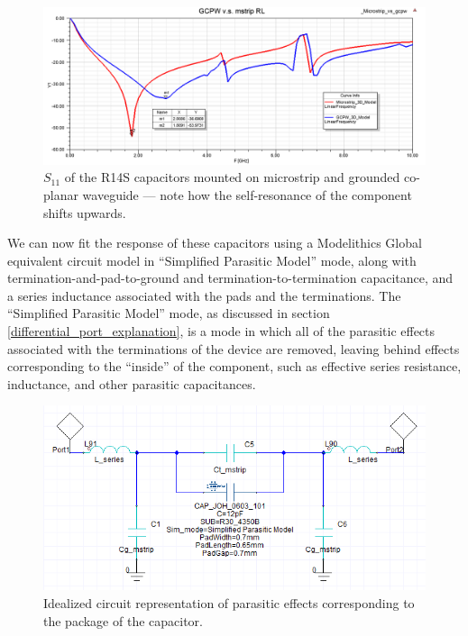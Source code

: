 \documentclass[12pt]{usfcoe}
\begin{document}
        \begin{figure}[H]
			\begin{center}
			\includegraphics[width=6in]{images/mstrip_v_gcpw/S11.png}
			\caption{$S_{11}$ of the R14S capacitors mounted on microstrip and grounded co-planar waveguide --- note how the self-resonance of the component shifts upwards.} 
			\label{fig:mstrip_gcpw_s11}
			\end{center}
        \end{figure}

    We can now fit the response of these capacitors using a Modelithics Global equivalent circuit model in ``Simplified Parasitic Model'' mode, along with termination-and-pad-to-ground and termination-to-termination capacitance, and a series inductance associated with the pads and the terminations.
    The ``Simplified Parasitic Model'' mode, as discussed in section \ref{differential_port_explanation}, is a mode in which all of the parasitic effects associated with the terminations of the device are removed, leaving behind effects corresponding to the ``inside'' of the component, such as effective series resistance, inductance, and other parasitic capacitances.
            
        \begin{figure}[H]
			\begin{center}
			\includegraphics[width=5in]{images/mstrip_v_gcpw/parasitic_topology.png}
			\caption{Idealized circuit representation of parasitic effects corresponding to the package of the capacitor.} 
			\label{fig:mstrip_gcpw_parasitic_network}
			\end{center}
		\end{figure}
\end{document}
